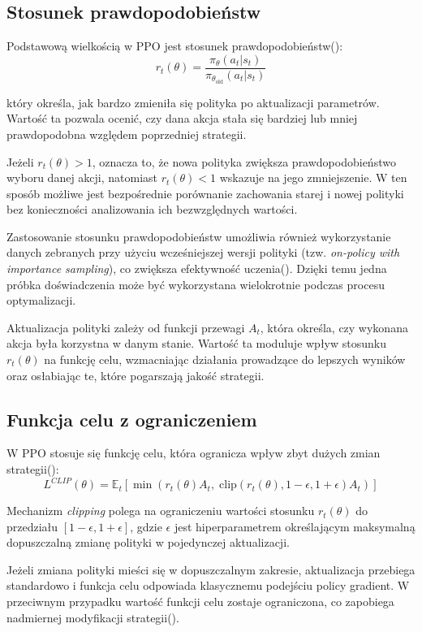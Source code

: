 \documentclass[12pt,twoside]{article}
\begin{document}
\subsection{Stosunek prawdopodobieństw}

Podstawową wielkością w PPO jest stosunek prawdopodobieństw(\cite{str11}):
\[
r_t(\theta) = \frac{\pi_\theta(a_t|s_t)}{\pi_{\theta_{\text{old}}}(a_t|s_t)}
\]

który określa, jak bardzo zmieniła się polityka po aktualizacji parametrów. Wartość ta pozwala ocenić, czy dana akcja stała się bardziej lub mniej prawdopodobna względem poprzedniej strategii.

Jeżeli $r_t(\theta) > 1$, oznacza to, że nowa polityka zwiększa prawdopodobieństwo wyboru danej akcji, natomiast $r_t(\theta) < 1$ wskazuje na jego zmniejszenie. W ten sposób możliwe jest bezpośrednie porównanie zachowania starej i nowej polityki bez konieczności analizowania ich bezwzględnych wartości.

Zastosowanie stosunku prawdopodobieństw umożliwia również wykorzystanie danych zebranych przy użyciu wcześniejszej wersji polityki (tzw. \textit{on-policy with importance sampling}), co zwiększa efektywność uczenia(\cite{str11}). Dzięki temu jedna próbka doświadczenia może być wykorzystana wielokrotnie podczas procesu optymalizacji.

Aktualizacja polityki zależy od funkcji przewagi $A_t$, która określa, czy wykonana akcja była korzystna w danym stanie. Wartość ta moduluje wpływ stosunku $r_t(\theta)$ na funkcję celu, wzmacniając działania prowadzące do lepszych wyników oraz osłabiając te, które pogarszają jakość strategii.



\subsection{Funkcja celu z ograniczeniem}

W PPO stosuje się funkcję celu, która ogranicza wpływ zbyt dużych zmian strategii(\cite{str11}):
\[
L^{CLIP}(\theta) = \mathbb{E}_t \left[
\min \left(
r_t(\theta) A_t,\;
\text{clip}(r_t(\theta), 1 - \epsilon, 1 + \epsilon) A_t
\right)
\right]
\]

Mechanizm \textit{clipping} polega na ograniczeniu wartości stosunku $r_t(\theta)$ do przedziału $[1 - \epsilon, 1 + \epsilon]$, gdzie $\epsilon$ jest hiperparametrem określającym maksymalną dopuszczalną zmianę polityki w pojedynczej aktualizacji.

Jeżeli zmiana polityki mieści się w dopuszczalnym zakresie, aktualizacja przebiega standardowo i funkcja celu odpowiada klasycznemu podejściu policy gradient. W przeciwnym przypadku wartość funkcji celu zostaje ograniczona, co zapobiega nadmiernej modyfikacji strategii(\cite{str11}).
\end{document}
